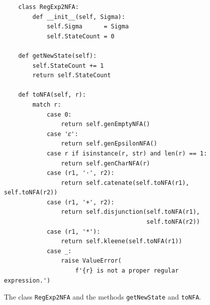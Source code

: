 \begin{figure}[!ht]
\centering
\begin{verbatim}
    class RegExp2NFA:
        def __init__(self, Sigma):
            self.Sigma      = Sigma
            self.StateCount = 0

    def getNewState(self):
        self.StateCount += 1
        return self.StateCount

    def toNFA(self, r):
        match r:
            case 0:
                return self.genEmptyNFA()
            case '𝜀':
                return self.genEpsilonNFA()
            case r if isinstance(r, str) and len(r) == 1:
                return self.genCharNFA(r)
            case (r1, '⋅', r2):
                return self.catenate(self.toNFA(r1), self.toNFA(r2))
            case (r1, '+', r2):
                return self.disjunction(self.toNFA(r1),
                                        self.toNFA(r2))
            case (r1, '*'):
                return self.kleene(self.toNFA(r1))
            case _:
                raise ValueError(
                    f'{r} is not a proper regular expression.')
\end{verbatim}
\vspace*{-0.3cm}
\caption{The class \texttt{RegExp2NFA} and the methods \texttt{getNewState} and \texttt{toNFA}.}
\label{fig:03-Regexp-2-NFA.ipynb:toNFA}
\end{figure}

